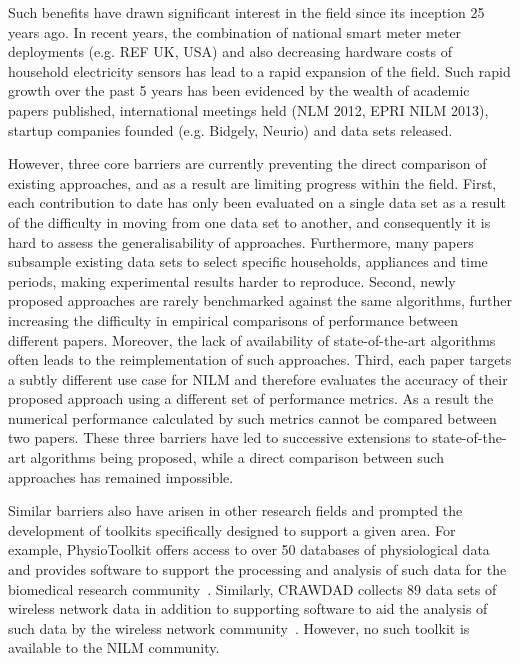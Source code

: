 \documentclass{sig-alternate}
\begin{document}
Such benefits have drawn significant interest in the field since its inception 25 years ago. In recent years, the combination of national smart meter meter deployments (e.g. REF UK, USA) and also decreasing hardware costs of household electricity sensors has lead to a rapid expansion of the field. Such rapid growth over the past 5 years has been evidenced by the wealth of academic papers published, international meetings held (NLM 2012, EPRI NILM 2013), startup companies founded (e.g. Bidgely, Neurio) and data sets released.

However, three core barriers are currently preventing the direct comparison of existing approaches, and as a result are limiting progress within the field. First, each contribution to date has only been evaluated on a single data set as a result of the difficulty in moving from one data set to another, and consequently it is hard to assess the generalisability of approaches. Furthermore, many papers subsample existing data sets to select specific households, appliances and time periods, making experimental results harder to reproduce. Second, newly proposed approaches are rarely benchmarked against the same algorithms, further increasing the difficulty in empirical comparisons of performance between different papers. Moreover, the lack of availability of state-of-the-art algorithms often leads to the reimplementation of such approaches. Third, each paper targets a subtly different use case for NILM and therefore evaluates the accuracy of their proposed approach using a different set of performance metrics. As a result the numerical performance calculated by such metrics cannot be compared between two papers. These three barriers have led to successive extensions to state-of-the-art algorithms being proposed, while a direct comparison between such approaches has remained impossible.

Similar barriers also have arisen in other research fields and prompted the development of toolkits specifically designed to support a given area. For example, PhysioToolkit offers access to over 50 databases of physiological data and provides software to support the processing and analysis of such data for the biomedical research community~\cite{physionet}. Similarly, CRAWDAD collects 89 data sets of wireless network data in addition to supporting software to aid the analysis of such data by the wireless network community~\cite{crawdad}. However, no such toolkit is available to the NILM community.
\end{document}
